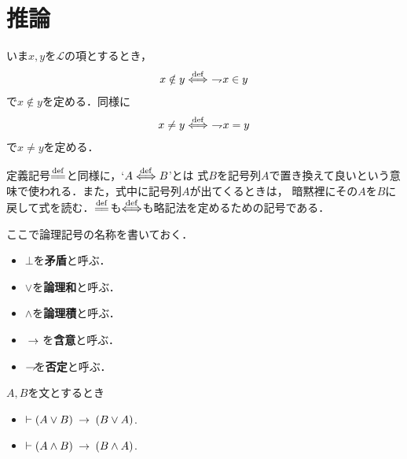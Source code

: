 \section{推論}
	いま$x,y$を$\mathcal{L}$の項とするとき，
	\begin{align}
		x \notin y \overset{\mathrm{def}}{\Longleftrightarrow}\ \rightharpoondown\hspace{-0.25em} x \in y
	\end{align}
	で$x \notin y$を定める．同様に
	\begin{align}
		x \neq y \overset{\mathrm{def}}{\Longleftrightarrow}\ \rightharpoondown\hspace{-0.25em} x = y
	\end{align}
	で$x \neq y$を定める．
	
	定義記号$\defeq$と同様に，`$A \overset{\mathrm{def}}{\Longleftrightarrow} B$'とは
	式$B$を記号列$A$で置き換えて良いという意味で使われる．また，式中に記号列$A$が出てくるときは，
	暗黙裡にその$A$を$B$に戻して式を読む．$\defeq$も$\overset{\mathrm{def}}{\Longleftrightarrow}$も略記法を定めるための記号である．
	
	ここで論理記号の名称を書いておく．
	\begin{itemize}
		\item $\bot$を{\bf 矛盾}と呼ぶ．
		\item $\vee$を{\bf 論理和}と呼ぶ．
		\item $\wedge$を{\bf 論理積}と呼ぶ．
		\item $\hspace{0.25em}\rightarrow\hspace{0.25em}$を{\bf 含意}と呼ぶ．
		\item $\rightharpoondown\hspace{-0.25em}$を{\bf 否定}と呼ぶ．
	\end{itemize}
	
	\begin{screen}
		\begin{logicalthm}
		\label{logicalthm:commutative_law_of_disjunction_and_conjunction}
			$A,B$を文とするとき
			\begin{itemize}
				\item $\vdash (A \vee B) \hspace{0.25em}\rightarrow\hspace{0.25em} (B \vee A)$.
				\item $\vdash (A \wedge B) \hspace{0.25em}\rightarrow\hspace{0.25em} (B \wedge A)$.
			\end{itemize}
		\end{logicalthm}
	\end{screen}
	
